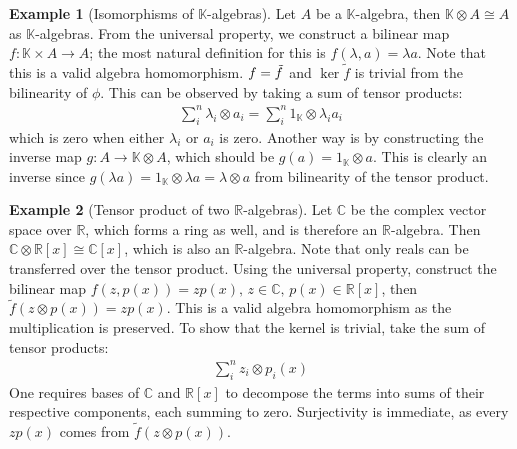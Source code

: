 \documentclass{article}
\theoremstyle{definition}
\newtheorem*{Example*}{Example}
\theoremstyle{remark}
\theoremstyle{underline}
\theoremstyle{underline}
\let\Im\relax
\DeclareMathOperator{\Im}{Im}
\begin{document}
	\begin{Example*}[Isomorphisms of $\mathbb K$-algebras]
		Let $A$ be a $\mathbb K$-algebra, then $\mathbb K \otimes A \cong A$ as $\mathbb K$-algebras. From the universal property, we construct a bilinear map $f \colon \mathbb K \times A \to A$; the most natural definition for this is $f(\lambda, a) = \lambda a$. Note that this is a valid algebra homomorphism. $\Im f = \Im \tilde f$ and $\ker \tilde f$ is trivial from the bilinearity of $\phi$. This can be observed by taking a sum of tensor products:
		\begin{gather*}
			\sum_i^n \lambda_i \otimes a_i = \sum_i^n 1_{\mathbb K} \otimes \lambda_i a_i	
		\end{gather*}
		which is zero when either $\lambda_i$ or $a_i$ is zero. Another way is by constructing the inverse map $g \colon A \to \mathbb K \otimes A $, which should be $g(a) = 1_{\mathbb K} \otimes a$. This is clearly an inverse since $g(\lambda a) = 1_{\mathbb K} \otimes \lambda a = \lambda \otimes a$ from bilinearity of the tensor product.
	\end{Example*}

	\begin{Example*}[Tensor product of two $\mathbb R$-algebras]
		Let $\mathbb C$ be the complex vector space over $\mathbb R$, which forms a ring as well, and is therefore an $\mathbb R$-algebra. Then $\mathbb C \otimes \mathbb R[x] \cong \mathbb C[x]$, which is also an $\mathbb R$-algebra. Note that only reals can be transferred over the tensor product.
		Using the universal property, construct the bilinear map $f(z, p(x)) = zp(x),\, z \in \mathbb C,\, p(x) \in \mathbb R[x]$, then $\tilde f(z \otimes p(x)) = zp(x)$. This is a valid algebra homomorphism as the multiplication is preserved. To show that the kernel is trivial, take the sum of tensor products:
		\begin{gather*}
			\sum_i^n z_i \otimes p_i(x)
		\end{gather*}
		One requires bases of $\mathbb C$ and $\mathbb R[x]$ to decompose the terms into sums of their respective components, each summing to zero. Surjectivity is immediate, as every $zp(x)$ comes from $\tilde f(z \otimes p(x))$.
	\end{Example*}
\end{document}
